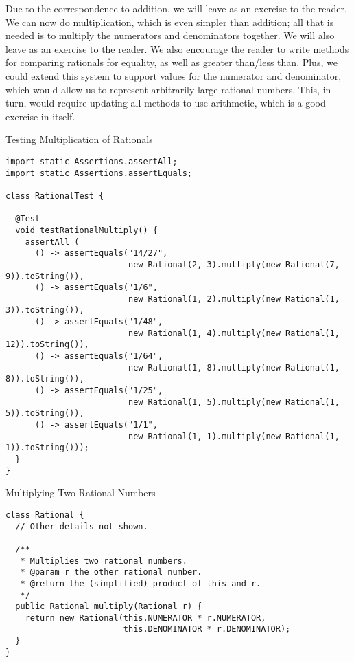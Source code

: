 Due to the correspondence to addition, we will leave  as an exercise to the reader. We can now do multiplication, which is even simpler than addition; all that is needed is to multiply the numerators and denominators together. We will also leave  as an exercise to the reader. We also encourage the reader to write methods for comparing rationals for equality, as well as greater than/less than. Plus, we could extend this system to support  values for the numerator and denominator, which would allow us to represent arbitrarily large rational numbers. This, in turn, would require updating all methods to use  arithmetic, which is a good exercise in itself.

\begin{cl}[]{Testing Multiplication of Rationals}
\begin{lstlisting}[language=MyJava]
import static Assertions.assertAll;
import static Assertions.assertEquals;

class RationalTest {

  @Test
  void testRationalMultiply() {
    assertAll (
      () -> assertEquals("14/27", 
                         new Rational(2, 3).multiply(new Rational(7, 9)).toString()),
      () -> assertEquals("1/6", 
                         new Rational(1, 2).multiply(new Rational(1, 3)).toString()),
      () -> assertEquals("1/48", 
                         new Rational(1, 4).multiply(new Rational(1, 12)).toString()),
      () -> assertEquals("1/64", 
                         new Rational(1, 8).multiply(new Rational(1, 8)).toString()),
      () -> assertEquals("1/25", 
                         new Rational(1, 5).multiply(new Rational(1, 5)).toString()),
      () -> assertEquals("1/1", 
                         new Rational(1, 1).multiply(new Rational(1, 1)).toString()));
  }
}
\end{lstlisting}
\end{cl}

\begin{cl}[]{Multiplying Two Rational Numbers}
\begin{lstlisting}[language=MyJava]
class Rational {
  // Other details not shown.

  /**
   * Multiplies two rational numbers.
   * @param r the other rational number.
   * @return the (simplified) product of this and r.
   */
  public Rational multiply(Rational r) {
    return new Rational(this.NUMERATOR * r.NUMERATOR, 
                        this.DENOMINATOR * r.DENOMINATOR);
  }
}
\end{lstlisting}
\end{cl}

